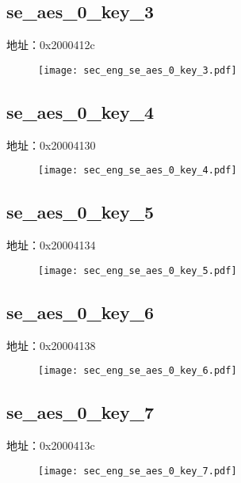 \subsection{se\_aes\_0\_key\_3}
\label{sec_eng-se-aes-0-key-3}
地址：0x2000412c
 \begin{figure}[H]
\texttt{[image: sec\_eng\_se\_aes\_0\_key\_3.pdf]}
\end{figure}

\subsection{se\_aes\_0\_key\_4}
\label{sec_eng-se-aes-0-key-4}
地址：0x20004130
 \begin{figure}[H]
\texttt{[image: sec\_eng\_se\_aes\_0\_key\_4.pdf]}
\end{figure}

\subsection{se\_aes\_0\_key\_5}
\label{sec_eng-se-aes-0-key-5}
地址：0x20004134
 \begin{figure}[H]
\texttt{[image: sec\_eng\_se\_aes\_0\_key\_5.pdf]}
\end{figure}

\subsection{se\_aes\_0\_key\_6}
\label{sec_eng-se-aes-0-key-6}
地址：0x20004138
 \begin{figure}[H]
\texttt{[image: sec\_eng\_se\_aes\_0\_key\_6.pdf]}
\end{figure}

\subsection{se\_aes\_0\_key\_7}
\label{sec_eng-se-aes-0-key-7}
地址：0x2000413c
 \begin{figure}[H]
\texttt{[image: sec\_eng\_se\_aes\_0\_key\_7.pdf]}
\end{figure}

